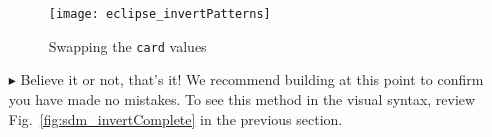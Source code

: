 \begin{itemize}
\vspace{0.5cm}

\begin{figure}[htbp]
\begin{center}
  \texttt{[image: eclipse\_invertPatterns]}
  \caption{Swapping the \texttt{card} values}  
  \label{fig:invertPatterns}
\end{center}
\end{figure}

\item[$\blacktriangleright$] Believe it or not, that's it! We recommend building at this point to confirm you have made no mistakes. To
see this method in the visual syntax, review Fig.~\ref{fig:sdm_invertComplete} in the previous section.

\end{itemize}
